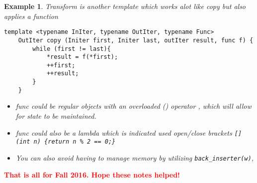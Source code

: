 \documentclass{article}
\newtheorem{ex}[theorem]{Example}
\begin{document}
\begin{ex} Transform is another template which works alot like copy but also applies a function 
\begin{lstlisting}
template <typename InIter, typename OutIter, typename Func>
	OutIter copy (Initer first, Initer last, outIter result, func f) {
		while (first != last){
			*result = f(*first);
			++first;
			++result;
		}
	}
\end{lstlisting}
\begin{itemize}
\item func could be regular objects with an overloaded () operator , which will allow for state to be maintained. 
\item func could also be a lambda which is indicated used open/close brackets 
\verb|[](int n) {return n % 2 == 0;} |
\item You can also avoid having to manage memory by utilizing \verb|back_inserter(w)|,
\end{itemize} 
\end{ex}

\begin{center}
\textbf{\textcolor{red}{That is all for Fall 2016. Hope these notes helped!}}
\end{center}
\end{document}
